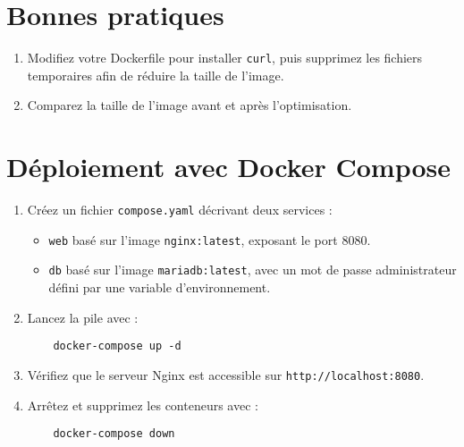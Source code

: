 \documentclass{article}%
\begin{document}
\section{Bonnes pratiques}
\begin{enumerate}
    \item Modifiez votre Dockerfile pour installer \texttt{curl}, puis supprimez les fichiers
    temporaires afin de réduire la taille de l’image.
    \item Comparez la taille de l’image avant et après l’optimisation.
\end{enumerate}

\section{Déploiement avec Docker Compose}
\begin{enumerate}
    \item Créez un fichier \texttt{compose.yaml} décrivant deux services :
    \begin{itemize}
        \item \texttt{web} basé sur l’image \texttt{nginx:latest}, exposant le port 8080.
        \item \texttt{db} basé sur l’image \texttt{mariadb:latest}, avec un mot de passe
        administrateur défini par une variable d’environnement.
    \end{itemize}
    \item Lancez la pile avec :
    \begin{verbatim}
    docker-compose up -d
    \end{verbatim}
    \item Vérifiez que le serveur Nginx est accessible sur \texttt{http://localhost:8080}.
    \item Arrêtez et supprimez les conteneurs avec :
    \begin{verbatim}
    docker-compose down
    \end{verbatim}
\end{enumerate}
\end{document}
